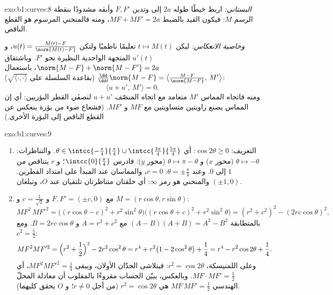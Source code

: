 \begin{solution}{exo:b1:curves:8}
\emph{البستاني:} اربط خيطًا طوله $2a$ إلى وتدين $F,
F'$ وأبقه مشدودًا بنقطة الرسم $M$: فيكون القيد
بالضبط $MF + MF' = 2a$، ومنه فالمنحني المرسوم هو القطع الناقص.

\emph{وخاصية الانعكاس:} ليكن $t \mapsto M(t)$ تعليمًا
ناظميًا ولتكن $u(t) = \frac{M(t) - F}{\norm{M(t) - F}}$،
و $u'(t)$ المتجهة الواحدية النظيرة نحو $F'$. وباشتقاق
$\norm{M - F} + \norm{M - F'} = 2a$، باستعمال $\frac{\dd}{\dd
t}\norm{M - F} = \bigl\langle \frac{M - F}{\norm{M-F}},\,
M'\bigr\rangle$ (بقاعدة السلسلة على $\sqrt{\langle\cdot,\cdot\rangle}$):
\[
\bigl\langle u + u',\, M'\bigr\rangle = 0 .
\]
ومنه فاتجاه المماس $M'$ متعامد مع اتجاه المنصّف
$u + u'$ لنصفَي القطر البؤريين: أي إن المماس يصنع زاويتين
متساويتين مع $MF$ و $MF'$. (فشعاع ضوء من بؤرة ينعكس
عن القطع الناقص إلى البؤرة الأخرى.)
\end{solution}

\begin{solution}{exo:b1:curves:9}
\begin{enumerate}
  \item {} التعريف: $\cos 2\theta \geq 0$: أي $\theta \in
        \intcc{-\frac\pi4}{\frac\pi4} \cup
        \intcc{\frac{3\pi}{4}}{\frac{5\pi}{4}}$. والتناظرات: $\theta
        \mapsto -\theta$ (محور $x$) و $\theta \mapsto \pi -
        \theta$ (محور $y$): فادرس $\intcc{0}{\frac\pi4}$؛ و $r$
        يتناقص من $1$ إلى $0$. وعند $\theta = \pm\frac\pi4$: $r =
        0$، والمماسان عند المبدأ على امتداد القطرين. والمنحني
        هو رمز $\infty$: أي حلقتان متناظرتان تلتقيان عند $O$،
        وتبلغان $(\pm 1, 0)$.
  \item مع $F, F' = (\pm c, 0)$ و $c = \frac{1}{\sqrt 2}$ و $M
        = (r\cos\theta, r\sin\theta)$:
        \[
        MF^2\, MF'^2
        = \bigl((r\cos\theta - c)^2 + r^2\sin^2\theta\bigr)
        \bigl((r\cos\theta + c)^2 + r^2\sin^2\theta\bigr)
        = (r^2 + c^2)^2 - (2rc\cos\theta)^2 ,
        \]
        بالمتطابقة $(A - B)(A + B) = A^2 - B^2$ مع $A = r^2
        + c^2$ و $B = 2rc\cos\theta$. ومع $c^2 = \frac12$:
        \[
        MF^2 MF'^2 = \Bigl(r^2 + \frac12\Bigr)^2 - 2r^2\cos^2\theta
        = r^4 + r^2\bigl(1 - 2\cos^2\theta\bigr) + \frac14
        = r^4 - r^2\cos 2\theta + \frac14 .
        \]
        وعلى اللمنيسكة، $r^2 = \cos 2\theta$: فيتلاشى الحدّان الأولان،
        ويبقى $MF^2MF'^2 = \frac14$، أي $MF \cdot MF' =
        \frac12$. وبالعكس، يبيّن الحساب مقروءًا بالمقلوب أن
        معادلة المحلّ الهندسي $MF\,MF' = \frac12$ هي $r^2 = \cos
        2\theta$ (من أجل $r \neq 0$؛ و $O$ يحقق كليهما).
\end{enumerate}
\end{solution}

